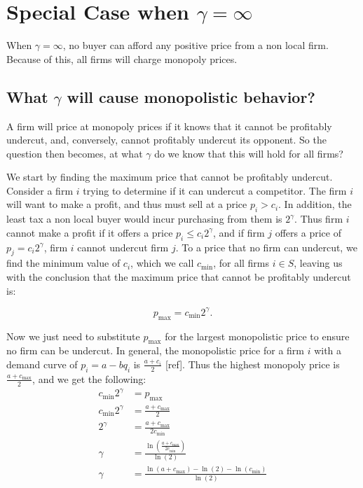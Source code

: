 \documentclass[11pt]{article}
\begin{document}
\section{Special Case when $\gamma = \infty$}
When $\gamma = \infty$, no buyer can afford any positive price from a non local
firm. Because of this, all firms will charge monopoly prices.

\subsection{What $\gamma$ will cause monopolistic behavior?}
A firm will price at monopoly prices if it knows that it cannot be profitably
undercut, and, conversely, cannot profitably undercut its opponent. So the
question then becomes, at what $\gamma$ do we know that this will hold for all
firms?

We start by finding the maximum price that cannot be profitably undercut.
Consider a firm $i$ trying to determine if it can undercut a competitor. The
firm $i$ will want to make a profit, and thus must sell at a price $p_i > c_i$.
In addition, the least tax a non local buyer would incur purchasing from them
is $2^\gamma$. Thus firm $i$ cannot make a profit if it offers a price $p_i
\leq c_i 2^\gamma$, and if firm $j$ offers a price of $p_j=c_i2^\gamma$, firm
$i$ cannot undercut firm $j$. To a price that no firm can undercut, we find the
minimum value of $c_i$, which we call $c_\text{min}$, for all firms $i\in S$,
leaving us with the conclusion that the maximum price that cannot be profitably
undercut is:

\begin{equation}
  p_\text{max} = c_\text{min}2^\gamma.
\end{equation}

Now we just need to substitute $p_\text{max}$ for the largest monopolistic
price to ensure no firm can be undercut. In general, the monopolistic price for
a firm $i$ with a demand curve of $p_i = a-bq_i$ is $\frac{a+c_i}{2}$ [ref].
Thus the highest monopoly price is $\frac{a+c_\text{max}}{2}$, and we get the
following:
\begin{align}
  c_\text{min}2^\gamma &= p_\text{max}\\
  c_\text{min}2^\gamma &= \frac{a+c_\text{max}}{2}\\
  2^\gamma &= \frac{a+c_\text{max}}{2c_\text{min}}\\
  \gamma &= \frac{\ln(\frac{a+c_\text{max}}{2c_\text{min}})}{\ln(2)}\\
  \gamma &= \frac{\ln(a+c_\text{max}) - \ln(2) -\ln(c_\text{min})}{\ln(2)}
\end{align}
\end{document}
